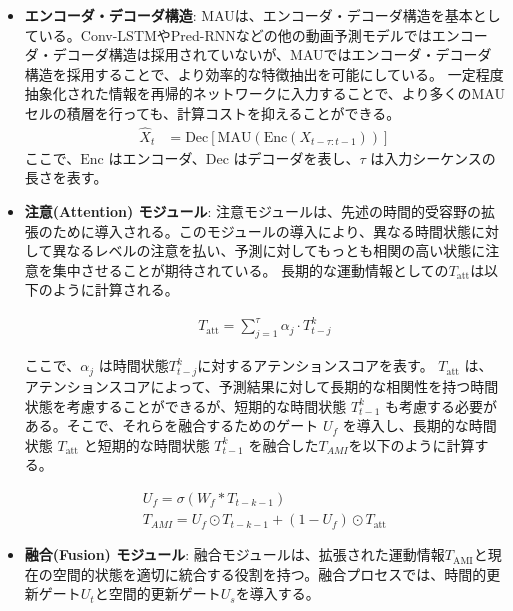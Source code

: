       \begin{itemize}
        \item \textbf{エンコーダ・デコーダ構造}: MAUは、エンコーダ・デコーダ構造を基本としている。Conv-LSTMやPred-RNNなどの他の動画予測モデルではエンコーダ・デコーダ構造は採用されていないが、MAUではエンコーダ・デコーダ構造を採用することで、より効率的な特徴抽出を可能にしている。
        一定程度抽象化された情報を再帰的ネットワークに入力することで、より多くのMAUセルの積層を行っても、計算コストを抑えることができる。
        \begin{align}
          \hat{X}_t &= \text{Dec}[\text{MAU}(\text{Enc}(X_{t-\tau:t-1}))]
        \end{align}
        ここで、\( \text{Enc} \) はエンコーダ、\( \text{Dec} \) はデコーダを表し、\( \tau \) は入力シーケンスの長さを表す。
          
          
        \item \textbf{注意(Attention) モジュール}: 
        注意モジュールは、先述の時間的受容野の拡張のために導入される。このモジュールの導入により、異なる時間状態に対して異なるレベルの注意を払い、予測に対してもっとも相関の高い状態に注意を集中させることが期待されている。
        長期的な運動情報としての\( T_{\text{att}} \)は以下のように計算される。

        \begin{align}
          T_{\text{att}} = \sum_{j=1}^{\tau} \alpha_j \cdot T_{t-j}^{k}
        \end{align}

        ここで、\( \alpha_j \) は時間状態\( T_{t-j}^{k} \)に対するアテンションスコアを表す。
        \( T_{\text{att}} \) は、アテンションスコアによって、予測結果に対して長期的な相関性を持つ時間状態を考慮することができるが、短期的な時間状態 \( T_{t-1}^{k} \) も考慮する必要がある。そこで、それらを融合するためのゲート \( U_f \) を導入し、長期的な時間状態 \( T_{\text{att}} \) と短期的な時間状態 \( T_{t-1}^{k} \) を融合した\( T_{AMI} \)を以下のように計算する。

        \begin{align}
          U_f = \sigma(W_f \ast T_{t-k-1}) \\
          T_{AMI} = U_f \odot T_{t-k-1} + (1 - U_f) \odot T_{\text{att}} 
        \end{align}

        \item \textbf{融合(Fusion) モジュール}: 融合モジュールは、拡張された運動情報\(T_{\text{AMI}} \)と現在の空間的状態を適切に統合する役割を持つ。融合プロセスでは、時間的更新ゲート\( U_t \)と空間的更新ゲート\( U_s \)を導入する。
        

\end{itemize}
